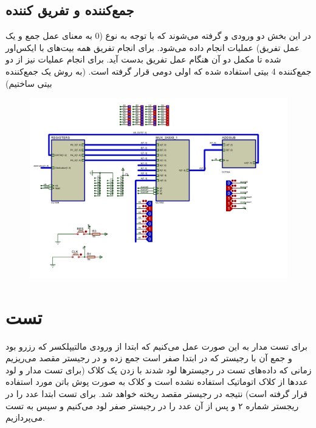 \documentclass{article}
\begin{document}
\subsection{جمع‌کننده و تفریق کننده}
در این بخش دو ورودی  و  گرفته می‌شوند که با توجه به نوع  (0 به معنای عمل جمع و یک عمل تفریق) عملیات انجام داده می‌شود. برای انجام تفریق همه بیت‌های با  ایکس‌اور شده تا مکمل دو آن هنگام عمل تفریق بدست آید. برای انجام عملیات نیز از دو جمع‌کننده 4 بیتی استفاده شده که  اولی  دومی قرار گرفته است. (به روش  یک جمع‌کننده  بیتی ساختیم)
\begin{figure}[H]
	\centering
	\includegraphics[scale=0.5,page=3]{graphics}
\end{figure}
\section{تست}
برای تست مدار به این صورت عمل می‌کنیم که ابتدا از ورودی مالتیپلکسر که رزرو بود و جمع آن با رجیستر  که در ابتدا صفر است جمع زده و در رجیستر مقصد می‌ریزیم زمانی که داده‌های تست در رجیسترها لود شدند با زدن یک کلاک (برای تست مدار و لود عددها از کلاک اتوماتیک استفاده نشده است و کلاک به صورت پوش باتن مورد استفاده قرار گرفته است) نتیجه در رجیستر مقصد ریخته خواهد شد.
برای تست ابتدا عدد  را در ریجستر شماره ۲ و پس از آن عدد  را در رجیستر صفر لود می‌کنیم و سپس به تست می‌پردازیم.
\end{document}

